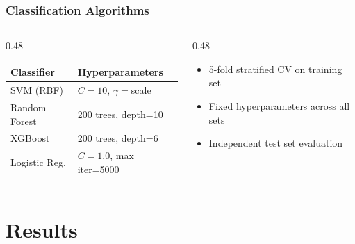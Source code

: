 \documentclass[aspectratio=169,professionalfonts]{beamer}
\begin{document}
\begin{frame}
    \frametitle{Classification Algorithms}
    \footnotesize
    
    \begin{columns}[T]
        \begin{column}{0.48\textwidth}
            \begin{table}
                \centering
                \footnotesize
                \begin{tabular}{ll}
                    \toprule
                    \textbf{Classifier} & \textbf{Hyperparameters} \\
                    \midrule
                    SVM (RBF) & $C=10$, $\gamma=$scale \\
                    Random Forest & 200 trees, depth=10 \\
                    XGBoost & 200 trees, depth=6 \\
                    Logistic Reg. & $C=1.0$, max iter=5000 \\
                    \bottomrule
                \end{tabular}
            \end{table}
        \end{column}
        
        \begin{column}{0.48\textwidth}
            \begin{itemize}
                \footnotesize
                \setlength{\itemsep}{2pt}
                \item 5-fold stratified CV on training set
                \item Fixed hyperparameters across all sets
                \item Independent test set evaluation
            \end{itemize}
        \end{column}
    \end{columns}
\end{frame}

\section{Results}
\end{document}
